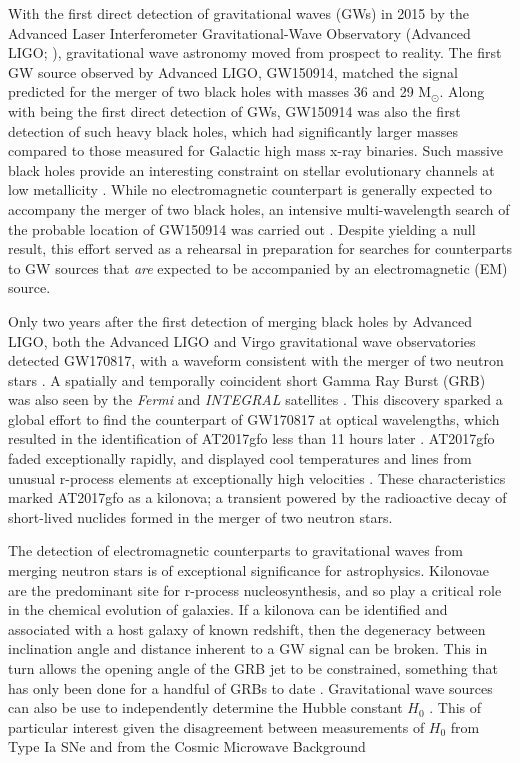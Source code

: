 \documentclass{aa}
\begin{document}
With the first direct detection of gravitational waves (GWs) in 2015 by the Advanced Laser Interferometer Gravitational-Wave
Observatory (Advanced LIGO; \citealp{FirstGW}), gravitational wave astronomy moved from prospect to reality. The first GW source observed by Advanced LIGO, GW150914, matched the signal predicted for the merger of two black holes with masses 36 and 29 M$_{\odot}$. Along with being the first direct detection of GWs, GW150914 was also the first detection of such heavy black holes, which had significantly larger masses compared to those measured for Galactic high mass x-ray binaries. Such massive black holes provide an interesting constraint on stellar evolutionary channels at low metallicity \citep[e.g.][]{FirstGW_astro, Belc16}. While no electromagnetic counterpart is generally expected to accompany the merger of two black holes, an intensive multi-wavelength search of the probable location of GW150914 was carried out \citep{FirstGW_EM}. Despite yielding a null result, this effort served as a rehearsal in preparation for searches for counterparts to GW sources that {\it are} expected to be accompanied by an 
electromagnetic (EM) source.

Only two years after the first detection of merging black holes by Advanced LIGO, both the Advanced LIGO and Virgo gravitational wave observatories detected GW170817, with a waveform consistent with the merger of two neutron stars \citep{GW170817}. A spatially and temporally coincident short Gamma Ray Burst (GRB) was also seen by the {\it Fermi} and {\it INTEGRAL} satellites \citep{GW170817_GRB}. This discovery sparked a global effort to find the counterpart of GW170817 at optical wavelengths, which resulted in the identification of AT2017gfo less than 11 hours later \citep{GW170817_EM}. AT2017gfo faded exceptionally rapidly, and displayed cool temperatures and lines from unusual r-process elements at exceptionally high velocities \citep{Smar17,Arca17,Pian17,Coul17,Kilp17}. These characteristics marked AT2017gfo as a kilonova; a transient powered by the radioactive decay of short-lived nuclides formed in the merger of two neutron stars.

The detection of electromagnetic counterparts to gravitational waves from merging neutron stars is of exceptional significance for astrophysics. Kilonovae are the predominant site for r-process nucleosynthesis, and so play a critical role in the chemical evolution of galaxies. If a kilonova can be identified and associated with a host galaxy of known redshift, then the degeneracy between inclination angle and distance inherent to a GW signal can be broken. This in turn allows the opening angle of the GRB jet to be constrained, something that has only been done for a handful of GRBs to date \citep{2018ApJ...857..128J}. Gravitational wave sources can also be use to independently determine the Hubble constant $H_0$ \citep{GWH0}. This of particular interest given the disagreement between measurements of $H_0$ from Type Ia SNe and from the Cosmic Microwave Background \citep[e.g.][]{Bern16}
\end{document}
